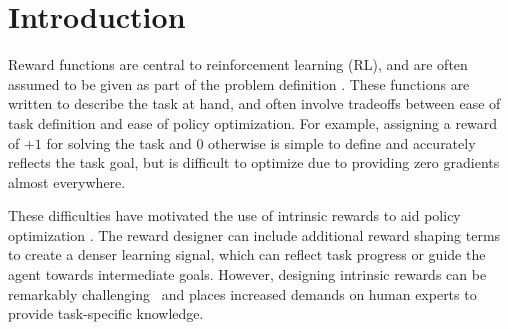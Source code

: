 \section{Introduction}
\label{sec:intro}
%
%
%
%
%
%
%
%
%
Reward functions are central to reinforcement learning (RL), and are often assumed to be given as part of the problem definition \citep{Sutton1998}. 
These functions are written to describe the task at hand, and often involve tradeoffs between ease of task definition and ease of policy optimization.  For example, assigning a reward of $+1$ for solving the task and $0$ otherwise is simple to define and accurately reflects the task goal, but is difficult to optimize due to providing zero gradients almost everywhere. 
%
%

These difficulties have motivated the use of intrinsic rewards to aid policy optimization
\citep{randlov1998shaping, ng1999rewardshaping, sorg2010internal, singh2010intrinsically}.  The reward designer can include additional reward shaping terms to create a denser learning signal, which can reflect task progress or guide the agent towards intermediate goals. However, designing intrinsic rewards can be remarkably challenging~\citep{booth23perils,  ibrahim2024comprehensive} 
and places increased demands on human experts to provide task-specific knowledge. 

